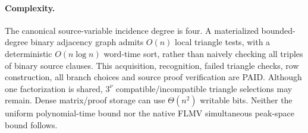 \documentclass[11pt]{article}
\begin{document}
\paragraph{Complexity.}
The canonical source-variable incidence degree is four. A materialized bounded-degree binary adjacency graph admits $O(n)$ local triangle tests, with a deterministic $O(n\log n)$ word-time sort, rather than naively checking all triples of binary source clauses. This acquisition, recognition, failed triangle checks, row construction, all branch choices and source proof verification are PAID. Although one factorization is shared, $3^\nu$ compatible/incompatible triangle selections may remain. Dense matrix/proof storage can use $\Theta(n^2)$ writable bits. Neither the uniform polynomial-time bound nor the native FLMV simultaneous peak-space bound follows.
\end{document}
